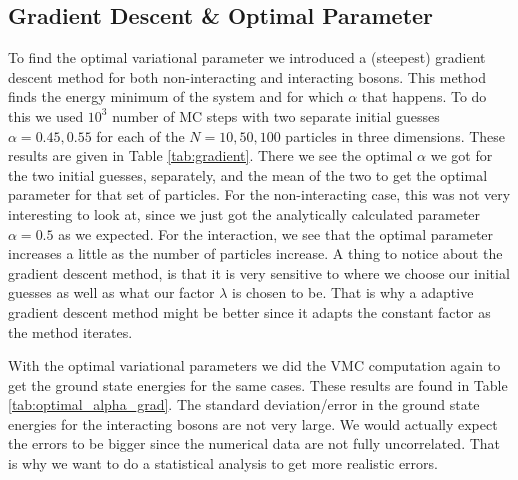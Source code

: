 \documentclass[12pt,a4paper,english]{article}
\begin{document}
\subsection{Gradient Descent \& Optimal Parameter}
\label{subsect:Result_gradient}
To find the optimal variational parameter we introduced a (steepest) gradient descent method for both non-interacting and interacting bosons. This method finds the energy minimum of the system and for which $\alpha$ that happens. To do this we used $10^3$ number of MC steps with two separate initial guesses $\alpha=0.45, 0.55$ for each of the $N=10,50,100$ particles in three dimensions. These results are given in Table \ref{tab:gradient}. There we see the optimal $\alpha$ we got for the two initial guesses, separately, and the mean of the two to get the optimal parameter for that set of particles. For the non-interacting case, this was not very interesting to look at, since we just got the analytically calculated parameter $\alpha=0.5$ as we expected. For the interaction, we see that the optimal parameter increases a little as the number of particles increase. A thing to notice about the gradient descent method, is that it is very sensitive to where we choose our initial guesses as well as what our factor $\lambda$ is chosen to be. That is why a adaptive gradient descent method might be better since it adapts the constant factor as the method iterates.

With the optimal variational parameters we did the VMC computation again to get the ground state energies for the same cases. These results are found in Table \ref{tab:optimal_alpha_grad}. The standard deviation/error in the ground state energies for the interacting bosons are not very large. We would actually expect the errors to be bigger since the numerical data are not fully uncorrelated. That is why we want to do a statistical analysis to get more realistic errors.
\end{document}
